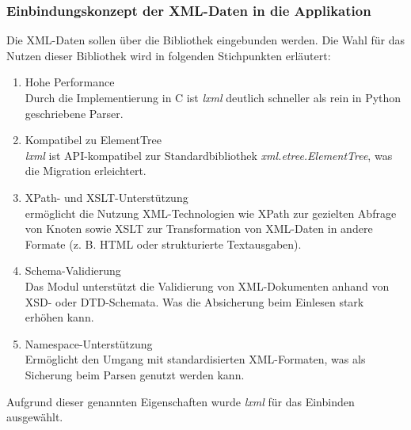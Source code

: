 \subsubsection{Einbindungskonzept der XML-Daten in die Applikation}

Die XML-Daten sollen über die Bibliothek  eingebunden werden.
Die Wahl für das Nutzen dieser Bibliothek wird in folgenden Stichpunkten erläutert: \cite{lxml}

\begin{enumerate}

\item Hohe Performance \\
Durch die Implementierung in C ist \textit{lxml} deutlich schneller als rein in Python geschriebene Parser.

\item Kompatibel zu ElementTree \\
\textit{lxml} ist API-kompatibel zur Standardbibliothek \textit{xml.etree.ElementTree}, was die Migration erleichtert.

\item XPath- und XSLT-Unterstützung \\
 ermöglicht die Nutzung XML-Technologien wie XPath zur gezielten Abfrage von Knoten sowie
XSLT zur Transformation von XML-Daten in andere Formate (z. B. HTML oder strukturierte Textausgaben).

\item Schema-Validierung \\
Das Modul unterstützt die Validierung von XML-Dokumenten anhand von XSD- oder \ac{DTD}-Schemata.
Was die Absicherung beim Einlesen stark erhöhen kann.

\item Namespace-Unterstützung \\
Ermöglicht den Umgang mit standardisierten XML-Formaten, was als Sicherung beim Parsen genutzt werden kann.

\end{enumerate}

Aufgrund dieser genannten Eigenschaften wurde \textit{lxml} für das Einbinden ausgewählt.





